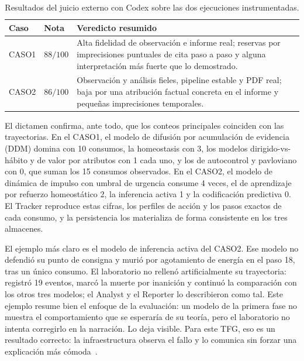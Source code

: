 \begin{table}[H]
\begin{center}
\small
\renewcommand{\arraystretch}{1.16}
\begin{tabular}{|>{\raggedright\arraybackslash}p{1.5cm}|>{\raggedright\arraybackslash}p{1.3cm}|>{\raggedright\arraybackslash}p{8.8cm}|} \hline
\textbf{Caso} & \textbf{Nota} & \textbf{Veredicto resumido} \\ \hline
CASO1 & $88/100$ & Alta fidelidad de observación e informe real; reservas por imprecisiones puntuales de cita paso a paso y alguna interpretación más fuerte que lo demostrado. \\ \hline
CASO2 & $86/100$ & Observación y análisis fieles, pipeline estable y PDF real; baja por una atribución factual concreta en el informe y pequeñas imprecisiones temporales. \\ \hline
\end{tabular}
\caption[Resultados del juicio externo]{Resultados del juicio externo con Codex
sobre las dos ejecuciones instrumentadas.}
\label{tab:codex-resultados}
\end{center}
\end{table}

El dictamen confirma, ante todo, que los conteos principales coinciden con las
trayectorias. En el CASO1, el modelo de difusión por
acumulación de evidencia (DDM) domina con 10 consumos, la homeostasis con 3, los
modelos dirigido-vs-hábito y de valor por atributos con 1 cada uno, y los de
autocontrol y pavloviano con 0, que suman los 15 consumos observados. En el
CASO2, el modelo de dinámica de impulso con umbral de urgencia consume 4 veces,
el de aprendizaje por refuerzo homeostático 2, la inferencia activa 1 y la
codificación predictiva 0. El Tracker reproduce estas cifras, los perfiles de
acción y los pasos exactos de cada consumo, y la persistencia los materializa de
forma consistente en los tres almacenes.

El ejemplo más claro es el modelo de inferencia activa del CASO2. Ese
modelo no defendió su punto de consigna y murió por agotamiento de
energía en el paso 18, tras un único consumo. El laboratorio no rellenó
artificialmente su trayectoria: registró 19 eventos, marcó la muerte por
inanición y continuó la comparación con los otros tres modelos; el Analyst y el
Reporter lo describieron como tal. Este ejemplo resume bien el enfoque de la
evaluación: un modelo de la primera fase no muestra el comportamiento que se
esperaría de su teoría, pero el laboratorio no intenta corregirlo en la
narración. Lo deja visible. Para este TFG, eso es un resultado correcto: la
infraestructura observa el fallo y lo comunica sin forzar una explicación más
cómoda~\cite{wilson2019tenrules,palminteri2017falsification}.

